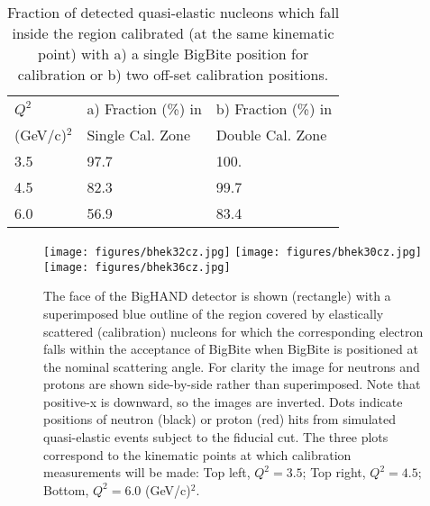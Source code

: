\documentclass[12pt,letterpaper,oneside]{article}
\begin{document}
\begin{table}
\begin{center}
\caption{
Fraction of detected quasi-elastic nucleons 
which fall inside the region calibrated
(at the same kinematic point) with a) a single BigBite position for
calibration or b) two off-set calibration positions.
\label{calzone-table}}
\vspace{.2in}
{\begin{tabular}{|l||l|l|}
\hline
$Q^2$&a) Fraction (\%) in&b) Fraction (\%) in\\
(GeV/c)$^2$&Single Cal. Zone&Double Cal. Zone\\
\hline
3.5& 97.7  &100.\\
4.5& 82.3  &99.7\\
6.0& 56.9  &83.4\\
\hline
\end{tabular}}
\end{center}
\end{table}


\begin{figure}
\begin{center}
\texttt{[image: figures/bhek32cz.jpg]}\hfill
\texttt{[image: figures/bhek30cz.jpg]}\\

\vspace{.35in}
\texttt{[image: figures/bhek36cz.jpg]}

\vspace{.35in}
\caption{\label{calzone1}
The face of the BigHAND detector is shown (rectangle) with a
superimposed blue outline of the region covered by elastically scattered
(calibration) nucleons for which the corresponding electron falls within the
acceptance of BigBite when BigBite is positioned at the
nominal scattering angle.  For clarity the image for neutrons and
protons are shown side-by-side rather than superimposed.  
Note that positive-x is downward, so the images are inverted.
 Dots indicate
positions of neutron (black) or proton (red) hits from simulated
quasi-elastic events subject to the fiducial cut.
The three plots
correspond to the kinematic points at which calibration measurements
will be made: 
Top left, $Q^2=3.5$; Top right, $Q^2=4.5$; Bottom, $Q^2=6.0$
(GeV/c)$^2$.}
\end{center}
\end{figure}
\end{document}
